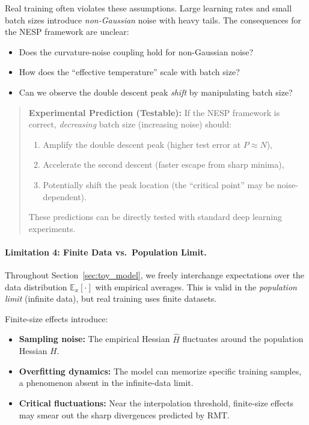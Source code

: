\documentclass[
  journal=largetwo,
  simfonts=false,
  year=2025,
  volume=37,
]{cup-journal}
\begin{document}
Real training often violates these assumptions. Large learning rates and small batch sizes introduce \textit{non-Gaussian} noise with heavy tails. The consequences for the NESP framework are unclear:
\begin{itemize}
    \item Does the curvature-noise coupling hold for non-Gaussian noise?
    \item How does the ``effective temperature'' scale with batch size?
    \item Can we observe the double descent peak \textit{shift} by manipulating batch size?
\end{itemize}

\begin{quote}
\textbf{Experimental Prediction (Testable):} If the NESP framework is correct, \textit{decreasing} batch size (increasing noise) should:
\begin{enumerate}
    \item Amplify the double descent peak (higher test error at $P \approx N$),
    \item Accelerate the second descent (faster escape from sharp minima),
    \item Potentially shift the peak location (the ``critical point'' may be noise-dependent).
\end{enumerate}
These predictions can be directly tested with standard deep learning experiments.
\end{quote}

\paragraph{Limitation 4: Finite Data vs.\ Population Limit.}

Throughout Section~\ref{sec:toy_model}, we freely interchange expectations over the data distribution $\mathbb{E}_x[\cdot]$ with empirical averages. This is valid in the \textit{population limit} (infinite data), but real training uses finite datasets.

Finite-size effects introduce:
\begin{itemize}
    \item \textbf{Sampling noise:} The empirical Hessian $\hat{H}$ fluctuates around the population Hessian $H$.
    \item \textbf{Overfitting dynamics:} The model can memorize specific training samples, a phenomenon absent in the infinite-data limit.
    \item \textbf{Critical fluctuations:} Near the interpolation threshold, finite-size effects may smear out the sharp divergences predicted by RMT.
\end{itemize}
\end{document}
